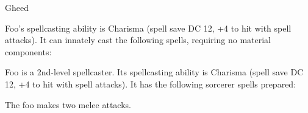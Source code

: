 \documentclass[10pt,twoside,twocolumn,openany]{dndbook}
\begin{document}
\begin{DndMonster}[float*=b,width=\textwidth + 8pt]{Gheed}
    \begin{multicols}{2}

    \DndMonsterBasics[
	armor-class = {12 con \emph{armadura de cuero}},
        hit-points  = {\DndDice{3d8 + 3}},
        speed       = {30 ft},
      ]

    \DndMonsterAbilityScores[
        str = 13,
        dex = 14,
        con = 13,
        int = 10,
        wis = 10,
        cha = 8,
      ]

    \DndMonsterDetails[
        senses = {visión en la oscuridad 60 pies, percepción pasiva 10},
        languages = {común, goblin},
        challenge = 3,
      ]
    Foo's spellcasting ability is Charisma (spell save DC 12, +4 to hit with spell attacks). It can innately cast the following spells, requiring no material components:
    \begin{DndMonsterSpells}
    \end{DndMonsterSpells}

    Foo is a 2nd-level spellcaster. Its spellcasting ability is Charisma (spell save DC 12, +4 to hit with spell attacks). It has the following sorcerer spells prepared:
    \begin{DndMonsterSpells}
    \end{DndMonsterSpells}

    The foo makes two melee attacks.


\end{multicols}
\end{DndMonster}
\end{document}
